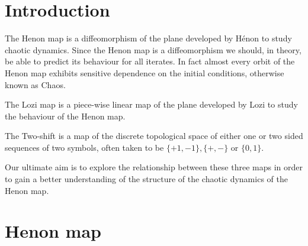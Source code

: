 \documentclass{amsart}
\begin{document}
\section{Introduction}

The Henon map is a diffeomorphism of the plane developed by H\'enon to study 
chaotic dynamics. Since the Henon map is a diffeomorphism we should, in 
theory, be able to predict its behaviour for all iterates. In fact almost 
every orbit of the Henon map exhibits sensitive dependence on the initial 
conditions, otherwise known as Chaos. 

The Lozi map is a piece-wise linear map of the plane developed by Lozi to 
study the behaviour of the Henon map. 

The Two-shift is a map of the discrete topological space of either one or two 
sided sequences of two symbols, often taken to be $\{+1, -1\}, \{+, -\}$ or 
$\{0, 1\}$. 

Our ultimate aim is to explore the relationship between these three maps in 
order to gain a better understanding of the structure of the chaotic dynamics 
of the Henon map. 

\section{Henon map} 
\end{document}
